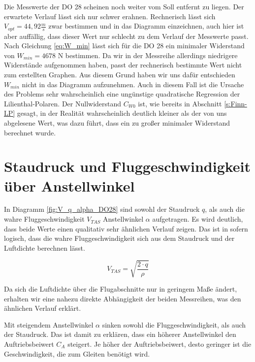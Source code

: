 Die Messwerte der DO 28 scheinen noch weiter vom Soll entfernt zu liegen. Der erwartete Verlauf lässt sich nur schwer erahnen. Rechnerisch lässt sich $V_{opt} = 44,92 \frac{m}{s}$ zwar bestimmen und in das Diagramm einzeichnen, auch hier ist aber auffällig, dass dieser Wert nur schlecht zu dem Verlauf der Messwerte passt. Nach Gleichung \ref{eq:W_min} lässt sich für die DO 28 ein minimaler Widerstand von $W_{min} = 4678$ N bestimmen. Da wir in der Messreihe allerdings niedrigere Widerstände aufgenommen haben, passt der rechnerisch bestimmte Wert nicht zum erstellten Graphen. Aus diesem Grund haben wir uns dafür entschieden $W_{min}$ nicht in das Diagramm aufzunehmen. Auch in diesem Fall ist die Ursache des Problems sehr wahrscheinlich eine ungünstige quadratische Regression der Lilienthal-Polaren. Der Nullwiderstand $C_{W0}$ ist, wie bereits in Abschnitt \ref{s:Finn-LP} gesagt, in der Realität wahrscheinlich deutlich kleiner als der von uns abgelesene Wert, was dazu führt, dass ein zu großer minimaler Widerstand berechnet wurde.

\section{Staudruck und Fluggeschwindigkeit über Anstellwinkel}
In Diagramm \ref{fig:V_q_alpha_DO28} sind sowohl der Staudruck $q$, als auch die wahre Fluggeschwindigkeit $V_{TAS}$ Anstellwinkel $\alpha$ aufgetragen. Es wird deutlich, dass beide Werte einen qualitativ sehr ähnlichen Verlauf zeigen. Das ist in sofern logisch, dass die wahre Fluggeschwindigkeit sich aus dem Staudruck und der Luftdichte berechnen lässt.

\begin{equation}
V_{TAS}= \sqrt{\frac{2 \cdot q}{\rho}}
\end{equation}

Da sich die Luftdichte über die Flugabschnitte nur in geringem Maße ändert, erhalten wir eine nahezu direkte Abhängigkeit der beiden Messreihen, was den ähnlichen Verlauf erklärt. 

Mit steigendem Anstellwinkel $\alpha$ sinken sowohl die Fluggeschwindigkeit, als auch der Staudruck. Das ist damit zu erklären, dass ein höherer Anstellwinkel den Auftriebsbeiwert $C_A$ steigert. Je höher der Auftriebsbeiwert, desto geringer ist die Geschwindigkeit, die zum Gleiten benötigt wird. 

